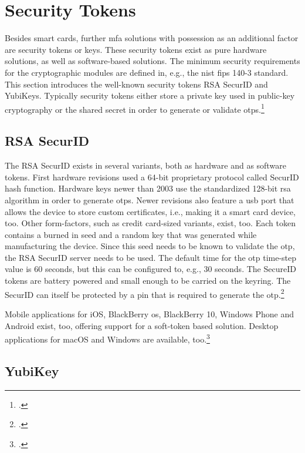 \section{Security Tokens}

Besides smart cards, further \gls{mfa} solutions with possession as an additional factor are security tokens or keys. These security tokens exist as pure hardware solutions, as well as software-based solutions. The minimum security requirements for the cryptographic modules are defined in, e.g., the \gls{nist} \gls{fips} 140-3 standard. This section introduces the well-known security tokens \frqq RSA SecurID\flqq{} and \frqq YubiKeys\flqq. Typically security tokens either store a private key used in public-key cryptography or the shared secret in order to generate or validate \glspl{otp}.\footcites[See][]{FIPS140-3}[See][Chapter 28.4.3]{1174011}

\subsection{RSA SecurID}

The RSA SecurID exists in several variants, both as hardware and as software tokens. First hardware revisions used a 64-bit proprietary protocol called \frqq SecurID hash function\flqq. Hardware keys newer than 2003 use the standardized 128-bit \gls{rsa} algorithm in order to generate \glspl{otp}. Newer revisions also feature a \gls{usb} port that allows the device to store custom certificates, i.e., making it a smart card device, too. Other form-factors, such as credit card-sized variants, exist, too. Each token contains a burned in seed and a random key that was generated while manufacturing the device. Since this seed needs to be known to validate the \gls{otp}, the RSA SecurID server needs to be used. The default time for the \gls{otp} time-step value is 60 seconds, but this can be configured to, e.g., 30 seconds. The SecureID tokens are battery powered and small enough to be carried on the keyring. The SecurID can itself be protected by a \gls{pin} that is required to generate the \gls{otp}.\footcites[See][479--480]{eckert-it-sec-9}[See][296]{4351500}

Mobile applications for iOS, BlackBerry \gls{os}, BlackBerry 10, Windows Phone and Android exist, too, offering support for a soft-token based solution. Desktop applications for macOS and Windows are available, too.\footcites[See][3--6]{ibm-mfa}[See][49]{5542954}

\subsection{YubiKey}


